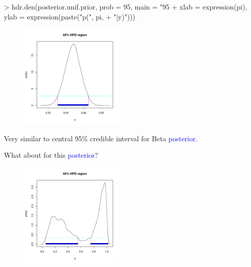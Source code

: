 \documentclass[handout]{beamer}
\begin{document}
\begin{frame}[fragile]
\tiny
\begin{Schunk}
\begin{Sinput}
> hdr.den(posterior.unif.prior, prob = 95, main = "95%
+     xlab = expression(pi), ylab = expression(paste("p(", pi, 
+         "|y)")))
\end{Sinput}
\end{Schunk}
\begin{figure}[!htp]
\begin{center}
\includegraphics[width = 2in, height = 2in]{summarize-hpd1.pdf}
\end{center}
\end{figure}
\pause
\normalsize
Very similar to central 95\% credible interval for Beta \textcolor{blue}{posterior}.
\end{frame}

\begin{frame}
What about for this \textcolor{blue}{posterior}?
\begin{figure}[!htp]
\begin{center}
\includegraphics[width = 2in, height = 2in]{summarize-hpd2.pdf}
\end{center}
\end{figure}
\end{frame}
\end{document}

